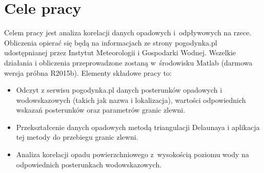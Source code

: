 \section{Cele pracy}
Celem pracy jest analiza korelacji danych opadowych i~odpływowych na rzece. Obliczenia opierać się będą na informacjach ze strony pogodynka.pl udostępnianej przez Instytut Meteorologii i Gospodarki Wodnej. Wszelkie działania i obliczenia przeprowadzone zostaną w~środowisku Matlab (darmowa wersja próbna R2015b). Elementy składowe pracy to:
\begin{itemize}
\item
Odczyt z serwisu pogodynka.pl danych posterunków opadowych i wodowskazowych (takich jak nazwa i lokalizacja), wartości odpowiednich wskazań posterunków oraz parametrów granic zlewni.
\item
Przekształcenie danych opadowych metodą triangulacji Delaunaya i aplikacja tej metody do przebiegu granic zlewni.
\item
Analiza korelacji opadu powierzchniowego z~wysokością poziomu wody na odpowiednich posterunkach wodowskazowych.
\end{itemize}